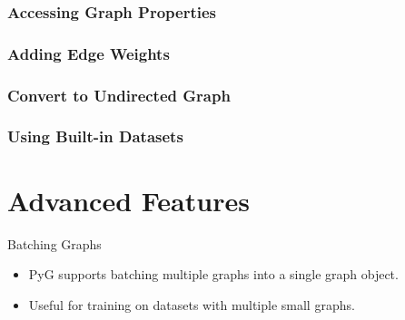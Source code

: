 \documentclass{beamer}
\begin{document}
\begin{frame}
\frametitle{Accessing Graph Properties}

\end{frame}

\begin{frame}
\frametitle{Adding Edge Weights}

\end{frame}

\begin{frame}
\frametitle{Convert to Undirected Graph}

\end{frame}

\begin{frame}
\frametitle{Using Built-in Datasets}

\end{frame}


\section{Advanced Features}

\begin{frame}{Batching Graphs}
    \begin{itemize}
        \item PyG supports batching multiple graphs into a single graph object.
        \item Useful for training on datasets with multiple small graphs.
    \end{itemize}

\end{frame}
\end{document}
